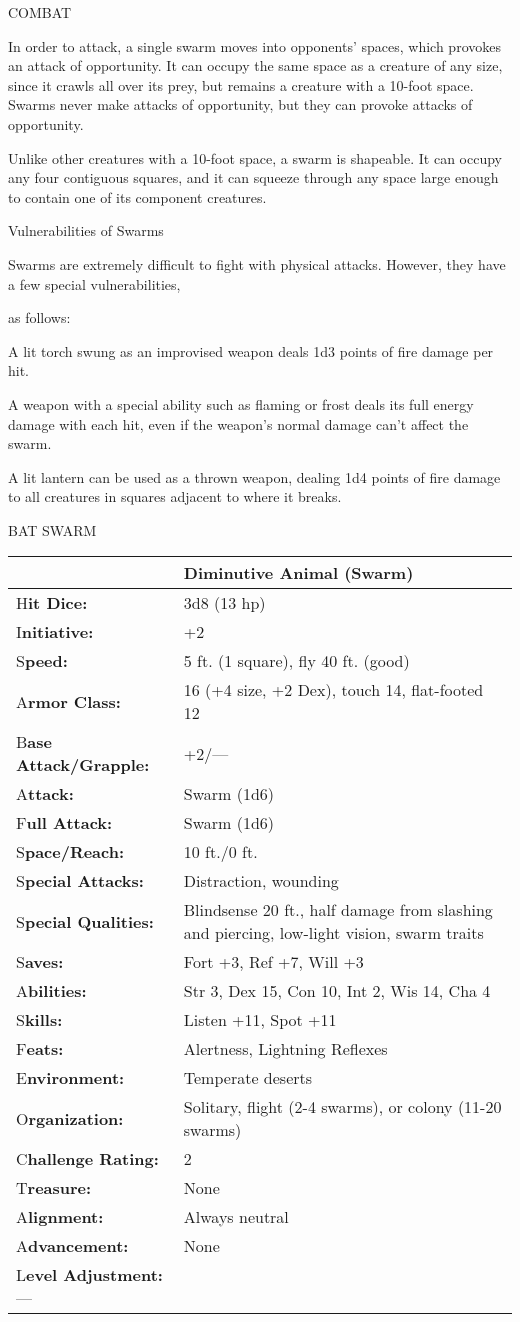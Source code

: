 \documentclass{article}
\begin{document}
COMBAT

In order to attack, a single swarm moves into opponents' spaces, which provokes 
an attack of opportunity. It can occupy the same space as a creature of any size, 
since it crawls all over its prey, but remains a creature with a 10-foot space. 
Swarms never make attacks of opportunity, but they can provoke attacks of opportunity.

Unlike other creatures with a 10-foot space, a swarm is shapeable. It can occupy 
any four contiguous squares, and it can squeeze through any space large enough 
to contain one of its component creatures.

Vulnerabilities of Swarms

Swarms are extremely difficult to fight with physical attacks. However, they have 
a few special vulnerabilities,

as follows:

A lit torch swung as an improvised weapon deals 1d3 points of fire damage per hit.

A weapon with a special ability such as flaming or frost deals its full energy 
damage with each hit, even if the weapon's normal damage can't affect the swarm.

A lit lantern can be used as a thrown weapon, dealing 1d4 points of fire damage 
to all creatures in squares adjacent to where it breaks.

\vspace{12pt}
BAT SWARM

\begin{tabular}{|>{\raggedright}p{91pt}|>{\raggedright}p{213pt}|}
\hline
  & Diminutive Animal (Swarm)\tabularnewline
\hline
H\textbf{it Dice:} & 3d8 (13 hp)\tabularnewline
\hline
I\textbf{nitiative:} & +2\tabularnewline
\hline
S\textbf{peed:} & 5 ft. (1 square), fly 40 ft. (good)\tabularnewline
\hline
A\textbf{rmor Class:} & 16 (+4 size, +2 Dex), touch 14, flat-footed 12\tabularnewline
\hline
B\textbf{ase Attack/Grapple:} & +2/---\tabularnewline
\hline
A\textbf{ttack:} & Swarm (1d6)\tabularnewline
\hline
F\textbf{ull Attack:} & Swarm (1d6)\tabularnewline
\hline
S\textbf{pace/Reach:} & 10 ft./0 ft.\tabularnewline
\hline
S\textbf{pecial Attacks:} & Distraction, wounding\tabularnewline
\hline
S\textbf{pecial Qualities:} & Blindsense 20 ft., half damage from slashing and 
piercing, low-light vision, swarm traits\tabularnewline
\hline
S\textbf{aves:} & Fort +3, Ref +7, Will +3\tabularnewline
\hline
A\textbf{bilities:} & Str 3, Dex 15, Con 10, Int 2, Wis 14, Cha 4\tabularnewline
\hline
S\textbf{kills:} & Listen +11, Spot +11\tabularnewline
\hline
F\textbf{eats:} & Alertness, Lightning Reflexes\tabularnewline
\hline
E\textbf{nvironment:} & Temperate deserts\tabularnewline
\hline
O\textbf{rganization:} & Solitary, flight (2-4 swarms), or colony (11-20 swarms)\tabularnewline
\hline
C\textbf{hallenge Rating:} & 2\tabularnewline
\hline
T\textbf{reasure:} & None\tabularnewline
\hline
A\textbf{lignment:} & Always neutral\tabularnewline
\hline
A\textbf{dvancement:} & None\tabularnewline
\hline
L\textbf{evel Adjustment:}--- & \tabularnewline
\hline
\end{tabular}
\end{document}
